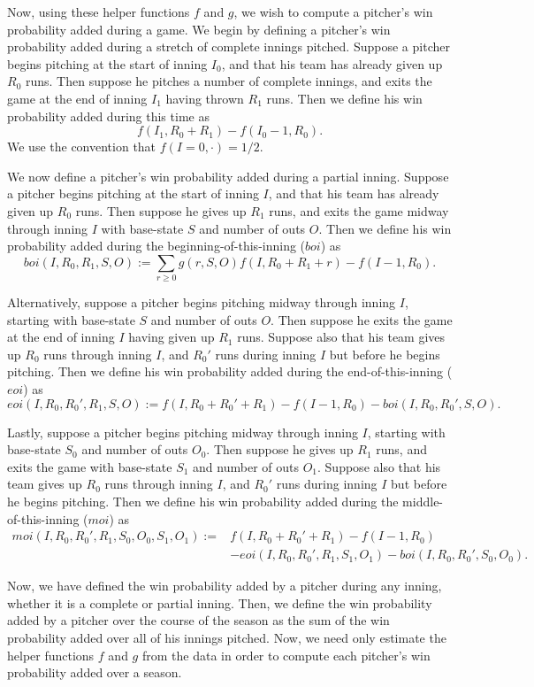 \documentclass[12pt]{article}
\begin{document}
Now, using these helper functions $f$ and $g$, we wish to compute a pitcher's win probability added during a game. We begin by defining a pitcher's win probability added during a stretch of complete innings pitched. Suppose a pitcher begins pitching at the start of inning $I_0$, and that his team has already given up $R_0$ runs. Then suppose he pitches a number of complete innings, and exits the game at the end of inning $I_1$ having thrown $R_1$ runs. Then we define his win probability added during this time as
$$f(I_1, R_0+R_1) - f(I_0 - 1, R_0).$$
We use the convention that $f(I=0,\cdot) = 1/2$.

We now define a pitcher's win probability added during a partial inning.  Suppose a pitcher begins pitching at the start of inning $I$, and that his team has already given up $R_0$ runs.  Then suppose he gives up $R_1$ runs, and exits the game midway through inning $I$ with base-state $S$ and number of outs $O$. Then we define his win probability added during the beginning-of-this-inning ($boi$) as
$$boi(I,R_0,R_1,S,O) := \sum_{r \geq 0} g(r,S,O) f(I,R_0+R_1+r)   - f(I-1,R_0).$$

Alternatively, suppose a pitcher begins pitching midway through inning $I$, starting with base-state $S$ and number of outs $O$. Then suppose he exits the game at the end of inning $I$ having given up $R_1$ runs. Suppose also that his team gives up $R_0$ runs through inning $I$, and $R_0'$ runs during inning $I$ but before he begins pitching. Then we define his win probability added during the end-of-this-inning ($eoi$) as
$$eoi(I,R_0,R_0',R_1,S,O) := f(I,R_0+R_0'+R_1) - f(I-1,R_0) - boi(I,R_0,R_0',S,O) .$$

Lastly, suppose a pitcher begins pitching midway through inning $I$, starting with base-state $S_0$ and number of outs $O_0$. Then suppose he gives up $R_1$ runs, and exits the game with base-state $S_1$ and number of outs $O_1$. Suppose also that his team gives up $R_0$ runs through inning $I$, and $R_0'$ runs during inning $I$ but before he begins pitching. Then we define his win probability added during the middle-of-this-inning ($moi$) as
\begin{align*}
moi(I,R_0,R_0',R_1,S_0,O_0,S_1,O_1) := & f(I,R_0+R_0'+R_1) - f(I-1,R_0) \\
&- eoi(I,R_0,R_0',R_1,S_1,O_1) - boi(I,R_0,R_0',S_0,O_0).
\end{align*}

Now, we have defined the win probability added by a pitcher during any inning, whether it is a complete or partial inning. Then, we define the win probability added by a pitcher over the course of the season as the sum of the win probability added over all of his innings pitched. Now, we need only estimate the helper functions $f$ and $g$ from the data in order to compute each pitcher's win probability added over a season. 
\end{document}
